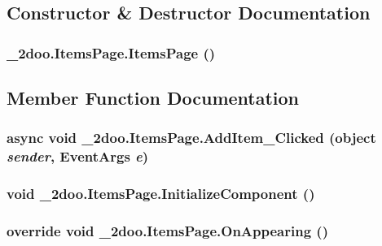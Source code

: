 \subsection{Constructor \& Destructor Documentation}
\hypertarget{class__2doo_1_1_items_page_cca6286efb67f30a0b329b46ba03fca7}{
\subsubsection[{ItemsPage}]{\setlength{\rightskip}{0pt plus 5cm}\_\-2doo.ItemsPage.ItemsPage ()}}
\label{class__2doo_1_1_items_page_cca6286efb67f30a0b329b46ba03fca7}




\subsection{Member Function Documentation}
\hypertarget{class__2doo_1_1_items_page_937ceb8011b2c319bdce7b583c4bb555}{
\subsubsection[{AddItem\_\-Clicked}]{\setlength{\rightskip}{0pt plus 5cm}async void \_\-2doo.ItemsPage.AddItem\_\-Clicked (object {\em sender}, \/  EventArgs {\em e})}}
\label{class__2doo_1_1_items_page_937ceb8011b2c319bdce7b583c4bb555}


\hypertarget{class__2doo_1_1_items_page_d918932efb8a9bb7f74e6120d4b4badb}{
\subsubsection[{InitializeComponent}]{\setlength{\rightskip}{0pt plus 5cm}void \_\-2doo.ItemsPage.InitializeComponent ()}}
\label{class__2doo_1_1_items_page_d918932efb8a9bb7f74e6120d4b4badb}


\hypertarget{class__2doo_1_1_items_page_a148952cd83870789da5468c14f7c93b}{
\subsubsection[{OnAppearing}]{\setlength{\rightskip}{0pt plus 5cm}override void \_\-2doo.ItemsPage.OnAppearing ()}}
\label{class__2doo_1_1_items_page_a148952cd83870789da5468c14f7c93b}


